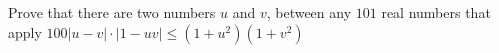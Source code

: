 Prove that there are two numbers $u$ and $v$, between any $101$ real numbers that apply $100 |u - v| \cdot |1 - uv|  \le (1 + u^2)(1 + v^2)$
